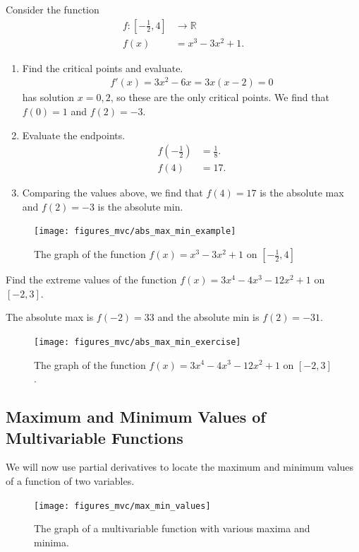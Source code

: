 \documentclass[12pt,letterpaper,reqno]{article}
\numberwithin{equation}{section}
\newcommand{\R}{\ensuremath{\mathbb R}}
\begin{document}
{\begin{example}
Consider the function
\begin{align*}
	f:\left[-\frac{1}{2},4\right] &\to \R \\
	f(x)&=x^3-3x^2+1.
\end{align*}	
\begin{enumerate}
	\item Find the critical points and evaluate.
	\begin{align*}
		f'(x)=3x^2-6x=3x(x-2)=0
	\end{align*}
	has solution $x=0,2$, so these are the only critical points. We find that $f(0)=1$ and $f(2)=-3$.
	\item Evaluate the endpoints.
	\begin{align*}
		f(-\frac{1}{2})&=\frac{1}{8}. \\
		f(4)&=17.
	\end{align*}
	\item Comparing the values above, we find that $f(4)=17$ is the absolute max and $f(2)=-3$ is the absolute min.
\end{enumerate}
\end{example}

\begin{figure}[h]
	\centering
	\texttt{[image: figures\_mvc/abs\_max\_min\_example]}
	\caption{The graph of the function $f(x)=x^3-3x^2+1$ on $[-\frac{1}{2},4]$}
\end{figure}

\begin{exercise}
Find the extreme values of the function $f(x)=3x^4-4x^3-12x^2+1$ on $[-2,3]$.	
\end{exercise}
\newpage 
{\color{red}
\begin{solution}
The absolute max is $f(-2)=33$ and the absolute min is $f(2)=-31$.	
\end{solution}
}
\begin{figure}[h]
	\centering
	\texttt{[image: figures\_mvc/abs\_max\_min\_exercise]}
	\caption{The graph of the function $f(x)=3x^4-4x^3-12x^2+1$ on $[-2,3]$.}
\end{figure}

\subsection{Maximum and Minimum Values of Multivariable Functions}
We will now use partial derivatives to locate the maximum and minimum values of a function of two variables.
\begin{figure}[h]
	\centering
	\texttt{[image: figures\_mvc/max\_min\_values]}
	\caption{The graph of a multivariable function with various maxima and minima.}
\end{figure}

}
\end{document}
